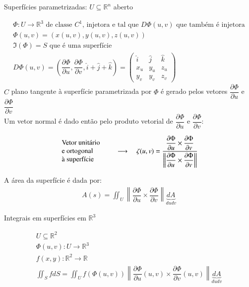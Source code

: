 \begin{large}
	Superfícies parametrizadas: $U \subseteq \mathbb{R}^n$ aberto
\end{large}
\begin{gather*}
\Phi :U\to\mathbb{R}^3 \text{ de classe } C^1 \text{, injetora e tal que } D\Phi(u,v) \text{ que também é injetora} \\ \Phi(u,v)=(x(u,v),y(u,v),z(u,v))\\
\Im(\Phi) = S \text{ que é uma superfície}\\
D\Phi(u,v)=\left( \dfrac{\partial \Phi}{\partial u}, \dfrac{\partial \Phi}{\partial v}, \hat{i}+\hat{j}+\hat{k}\right) = \begin{pmatrix}
\hat{i} & \hat{j} & \hat{k} \\
x_u & y_u & z_u \\
y_v & y_v & z_v
\end{pmatrix}
\end{gather*}
\null\hspace{48pt}$C$ plano tangente à superfície parametrizada por $\Phi$ é gerado pelos vetores $\dfrac{\partial \Phi}{\partial u}$ e $\dfrac{\partial \Phi}{\partial v}$\\
\null\hspace{48pt}Um vetor normal é dado então pelo produto vetorial de $\dfrac{\partial \Phi}{\partial u}$ e $\dfrac{\partial \Phi}{\partial v}$:

\begin{gather*}
\text{
\begin{minipage}{68pt}
Vetor unitário \\ e ortogonal\\ à superfície
\end{minipage}}\hspace{10pt}\longrightarrow \hspace{10pt}
\zeta (u,v) = \dfrac{\dfrac{\partial \Phi}{\partial u} \times \dfrac{\partial \Phi}{\partial v}}{\left\lVert \dfrac{\partial \Phi}{\partial u} \times \dfrac{\partial \Phi}{\partial v}\right\rVert}
\end{gather*}

\null\hspace{48pt}A área da superfície é dada por:
\begin{gather*}
A(s)=\displaystyle\iint_U \left\lVert \dfrac{\partial \Phi}{\partial u} \times \dfrac{\partial \Phi}{\partial v}\right\rVert \underbrace{dA}_{dudv}
\end{gather*}

\begin{large}
Integrais em superfícies em $\mathbb{R}^3$
\end{large}
\begin{gather*}
U \subseteq \mathbb{R}^2 \\
\Phi(u,v) :U\to \mathbb{R}^3 \\
f(x,y):\mathbb{R}^2\to \mathbb{R}\\
\displaystyle\iint_S fdS = \displaystyle\iint_U f(\Phi (u,v))\left\lVert \dfrac{\partial \Phi}{\partial u}(u,v) \times \dfrac{\partial \Phi}{\partial v}(u,v)\right\rVert \underbrace{dA}_{dudv}
\end{gather*}

